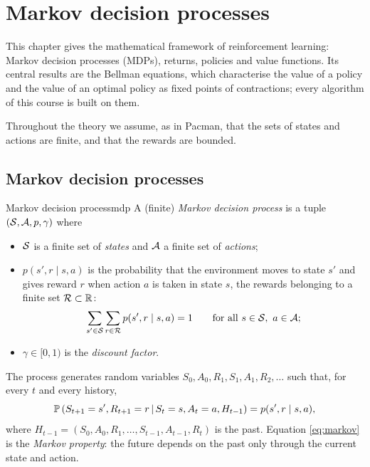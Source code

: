 \chapter{Markov decision processes}
\label{ch:mdp}

This chapter gives the mathematical framework of reinforcement learning:
Markov decision processes (MDPs), returns, policies and value functions. Its
central results are the Bellman equations, which characterise the value of
a policy and the value of an optimal policy as fixed points of contractions;
every algorithm of this course is built on them.

Throughout the theory we assume, as in Pacman, that the sets of states and
actions are finite, and that the rewards are bounded.

\section{Markov decision processes}

\begin{definition}{Markov decision process}{mdp}
  A (finite) \emph{Markov decision process} is a tuple
  $(\mathcal{S}, \mathcal{A}, p, \gamma)$ where
  \begin{itemize}[nosep]
    \item $\mathcal{S}$ is a finite set of \emph{states} and $\mathcal{A}$ a finite
      set of \emph{actions};
    \item $p(s', r \mid s, a)$ is the probability that the environment
      moves to state $s'$ and gives reward $r$ when action $a$ is taken in
      state $s$, the rewards belonging to a finite set $\mathcal{R} \subset
      \mathbb{R}$:
      \begin{equation}
        \sum_{s' \in \mathcal{S}} \sum_{r \in \mathcal{R}} p(s', r \mid s, a) = 1
        \qquad \text{for all } s \in \mathcal{S},\ a \in \mathcal{A};
      \end{equation}
    \item $\gamma \in [0, 1)$ is the \emph{discount factor}.
  \end{itemize}
  The process generates random variables $S_0, A_0, R_1, S_1, A_1, R_2,
  \dots$ such that, for every $t$ and every history,
  \begin{equation}
    \label{eq:markov}
    \mathbb{P}\left(S_{t+1} = s', R_{t+1} = r \,\middle|\, S_t = s, A_t = a,
      H_{t-1}\right) = p(s', r \mid s, a),
  \end{equation}
  where $H_{t-1} = (S_0, A_0, R_1, \dots, S_{t-1}, A_{t-1}, R_t)$ is the
  past. Equation \eqref{eq:markov} is the \emph{Markov property}: the future
  depends on the past only through the current state and action.
\end{definition}

